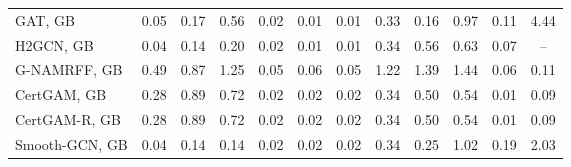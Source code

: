 \begin{table}[!t]
{\begin{tabular}{lccccccccccc}
GAT, GB & 0.05 & 0.17 & 0.56 & 0.02 & 0.01 & 0.01 & 0.33 & 0.16 & 0.97 & 0.11 & 4.44 \\
H2GCN, GB & 0.04 & 0.14 & 0.20 & 0.02 & 0.01 & 0.01 & 0.34 & 0.56 & 0.63 & 0.07 & -- \\
G-NAMRFF, GB & 0.49 & 0.87 & 1.25 & 0.05 & 0.06 & 0.05 & 1.22 & 1.39 & 1.44 & 0.06 & 0.11 \\
CertGAM, GB & 0.28 & 0.89 & 0.72 & 0.02 & 0.02 & 0.02 & 0.34 & 0.50 & 0.54 & 0.01 & 0.09 \\
CertGAM-R, GB & 0.28 & 0.89 & 0.72 & 0.02 & 0.02 & 0.02 & 0.34 & 0.50 & 0.54 & 0.01 & 0.09 \\
Smooth-GCN, GB & 0.04 & 0.14 & 0.14 & 0.02 & 0.02 & 0.02 & 0.34 & 0.25 & 1.02 & 0.19 & 2.03 \\
\bottomrule
\end{tabular}}
\end{table}
